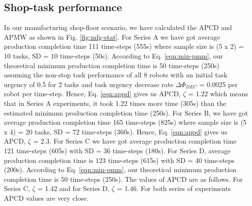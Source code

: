 \documentclass[journal]{IEEEtran}
\begin{document}
\subsection{Shop-task performance}
In our manufacturing shop-floor scenario, we have calculated the APCD and APMW as shown in Fig. \ref{fig:mfg-stat}. For Series A we have got  average production completion time 111 time-steps (555s) where sample size is (5 x 2) = 10 tasks, SD = 10 time-steps (50s). According to Eq. \ref{eqn:min-pmm}, our theoretical minimum production completion time is 50 time-steps (250s) assuming the non-stop task performance of all 8 robots with an initial task urgency of 0.5 for 2 tasks and task urgency decrease rate $\Delta \Phi_{DEC }$ = 0.0025 per robot per time-step.  Hence, Eq. \ref{eqn:appd} gives us APCD, $\zeta$ = 1.22 which means that in Series A experiments, it took 1.22 times more time (305s) than the estimated minimum production completion time (250s). For Series B, we have got average production completion time 165 time-steps (825s) where sample size is (5 x 4) = 20 tasks, SD = 72 time-steps (360s).  Hence, Eq. \ref{eqn:appd} gives us APCD, $\zeta$ = 2.3. For Series C we have got average production completion time 121 time-steps (605s) with SD = 36 time-steps (180s). For Series D,  average production completion time is 123 time-steps (615s) with SD = 40 time-steps (200s). According to Eq. \ref{eqn:min-pmm}, our theoretical minimum production completion time is 50 time-steps (250s).  The values of APCD are as follows. For Series C, $\zeta$ = 1.42 and for Series D, $\zeta$ = 1.46. For both series of experiments APCD values are very close.
\end{document}

